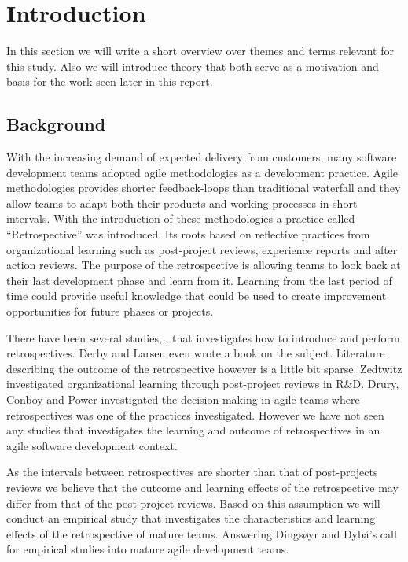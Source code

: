 \chapter{Introduction}

In this section we will write a short overview over themes and terms relevant for this study. Also we will introduce theory that both serve as a motivation and basis for the work seen later in this report.

\section{Background}
With the increasing demand of expected delivery from customers, many software development teams adopted agile methodologies as a development practice. Agile methodologies provides shorter feedback-loops than traditional waterfall and they allow teams to adapt both their products and working processes in short intervals. With the introduction of these methodologies a practice called ``Retrospective'' was introduced. Its roots based on reflective practices from organizational learning such as post-project reviews, experience reports and after action reviews. The purpose of the retrospective is allowing teams to look back at their last development phase and learn from it. Learning from the last period of time could provide useful knowledge that could be used to create improvement opportunities for future phases or projects. 

There have been several studies, \cite{Dingsoyr2004, Zedtwitz2002, bjornson2009, Hanssen2003, Dingsoyr2007, Bjarnason2012, Dingsoyr2003, Moe2001}, that investigates how to introduce and perform retrospectives. Derby and Larsen \cite{Larsen2006} even wrote a book on the subject. Literature describing the outcome of the retrospective however is a little bit sparse. Zedtwitz \cite{Zedtwitz2002} investigated organizational learning through post-project reviews in R\&D. Drury, Conboy and Power \cite{Drury2012} investigated the decision making in agile teams where retrospectives was one of the practices investigated. However we have not seen any studies that investigates the learning and outcome of retrospectives in an agile software development context. 

As the intervals between retrospectives are shorter than that of post-projects reviews we believe that the outcome and learning effects of the retrospective may differ from that of the post-project reviews. Based on this assumption we will conduct an empirical study that investigates the characteristics and learning effects of the retrospective of mature teams. Answering Dingsøyr and Dybå's call \cite{Dyba2008} for empirical studies into mature agile development teams. 

